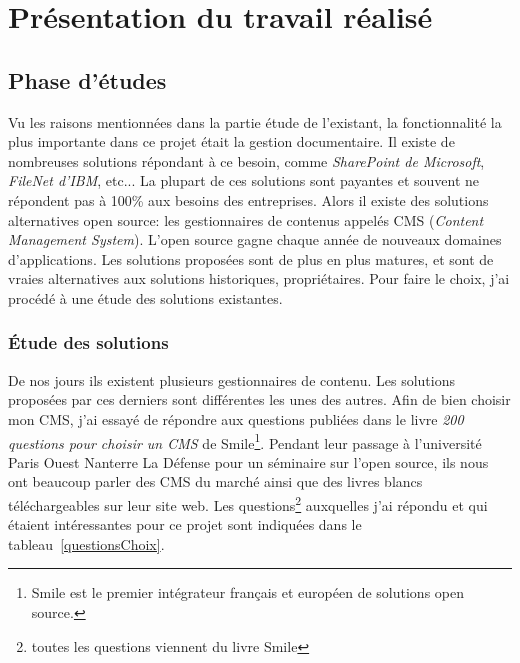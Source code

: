 \chapter{Présentation du travail réalisé} %

\label{Chapter3} %

\section{Phase d'études}
Vu les raisons mentionnées dans la partie étude de l'existant, la fonctionnalité la plus importante dans ce projet était la gestion documentaire. Il existe de nombreuses solutions répondant à ce besoin, comme \textit{SharePoint de Microsoft}, \textit{FileNet d'IBM}, etc... La plupart de ces solutions sont payantes et souvent ne répondent pas à 100\% aux besoins des entreprises. Alors il existe des solutions alternatives open source: les gestionnaires de contenus appelés CMS (\textit{Content Management System}). L'open source gagne chaque année de nouveaux domaines d'applications. Les solutions proposées sont de plus en plus matures, et sont de vraies alternatives aux solutions historiques, propriétaires\cite{ged}. Pour faire le choix, j'ai procédé à une étude des solutions existantes.
\subsection{Étude des solutions}
De nos jours ils existent plusieurs gestionnaires de contenu. Les solutions proposées par ces derniers sont différentes les unes des autres.
Afin de bien choisir mon CMS, j'ai essayé de répondre aux questions publiées dans le livre\cite{Choisir}  \textit{200 questions pour choisir un CMS} de Smile\footnote{Smile est le premier intégrateur français et européen de solutions open source.}. Pendant leur passage à l'université Paris Ouest Nanterre La Défense pour un séminaire sur l'open source, ils nous ont beaucoup parler des CMS du marché ainsi que des livres blancs téléchargeables sur leur site web. 
Les questions\footnote{toutes les questions viennent du livre Smile\cite{choixPage}} auxquelles j'ai répondu et qui étaient intéressantes pour ce projet sont indiquées dans le tableau~\ref{questionsChoix}.\\

